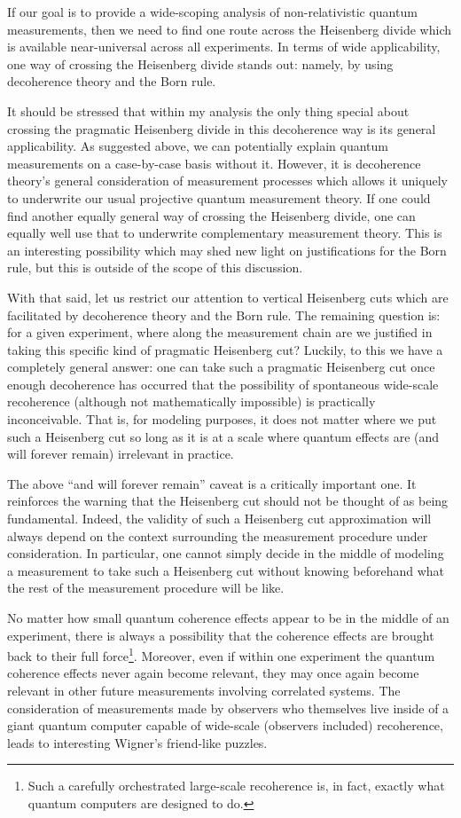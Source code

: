\documentclass[12pt,prd,superscriptaddress,floatfix,amsmath,amssymb,amsfonts,nofootinbib]{revtex4-2}
\begin{document}
If our goal is to provide a wide-scoping analysis of non-relativistic quantum measurements, then we need to find one route across the Heisenberg divide which is available near-universal across all experiments. In terms of wide applicability, one way of crossing the Heisenberg divide stands out: namely, by using decoherence theory and the Born rule.

It should be stressed that within my analysis the only thing special about crossing the pragmatic Heisenberg divide in this decoherence way is its general applicability. As suggested above, we can potentially explain quantum measurements on a case-by-case basis without it. However, it is decoherence theory's general consideration of measurement processes which allows it uniquely to underwrite our usual projective quantum measurement theory. If one could find another equally general way of crossing the Heisenberg divide, one can equally well use that to underwrite complementary measurement theory. This is an interesting possibility which may shed new light on justifications for the Born rule, but this is outside of the scope of this discussion.

With that said, let us restrict our attention to vertical Heisenberg cuts which are facilitated by decoherence theory and the Born rule. The remaining question is: for a given experiment, where along the measurement chain are we justified in taking this specific kind of pragmatic Heisenberg cut? Luckily, to this we have a completely general answer: one can take such a pragmatic Heisenberg cut once enough decoherence has occurred that the possibility of spontaneous wide-scale recoherence (although not mathematically impossible) is practically inconceivable. That is, for modeling purposes, it does not matter where we put such a Heisenberg cut so long as it is at a scale where quantum effects are (and will forever remain) irrelevant in practice.

The above ``and will forever remain'' caveat is a critically important one. It reinforces the warning that the Heisenberg cut should not be thought of as being fundamental. Indeed, the validity of such a Heisenberg cut approximation will always depend on the context surrounding the measurement procedure under consideration. In particular, one cannot simply decide in the middle of modeling a measurement to take such a Heisenberg cut without knowing beforehand what the rest of the measurement procedure will be like. 

No matter how small quantum coherence effects appear to be in the middle of an experiment, there is always a possibility that the coherence effects are brought back to their full force\footnote{Such a carefully orchestrated large-scale recoherence is, in fact, exactly what quantum computers are designed to do.}. Moreover, even if within one experiment the quantum coherence effects never again become relevant, they may once again become relevant in other future measurements involving correlated systems. The consideration of measurements made by observers who themselves live inside of a giant quantum computer capable of wide-scale (observers included) recoherence, leads to interesting Wigner's friend-like puzzles.
\end{document}
